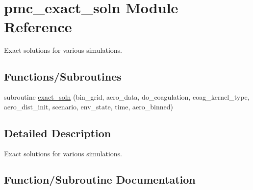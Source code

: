 \hypertarget{namespacepmc__exact__soln}{}\section{pmc\+\_\+exact\+\_\+soln Module Reference}
\label{namespacepmc__exact__soln}


Exact solutions for various simulations.  


\subsection*{Functions/\+Subroutines}
\begin{DoxyCompactItemize}
\item 
subroutine \mbox{\hyperlink{namespacepmc__exact__soln_aa2501f679b533b8505491ecf6a2aa8f1}{exact\+\_\+soln}} (bin\+\_\+grid, aero\+\_\+data, do\+\_\+coagulation, coag\+\_\+kernel\+\_\+type, aero\+\_\+dist\+\_\+init, scenario, env\+\_\+state, time, aero\+\_\+binned)
\end{DoxyCompactItemize}


\subsection{Detailed Description}
Exact solutions for various simulations. 

\subsection{Function/\+Subroutine Documentation}
\mbox{\label{namespacepmc__exact__soln_aa2501f679b533b8505491ecf6a2aa8f1}} 
